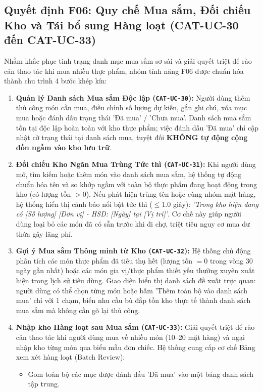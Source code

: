 \documentclass[10pt,a4paper]{article}
\begin{document}
\newpage
\subsection{Quyết định F06: Quy chế Mua sắm, Đối chiếu Kho và Tái bổ sung Hàng loạt (CAT-UC-30 đến CAT-UC-33)}
Nhằm khắc phục tình trạng danh mục mua sắm sơ sài và giải quyết triệt để rào cản thao tác khi mua nhiều thực phẩm, nhóm tính năng F06 được chuẩn hóa thành chu trình 4 bước khép kín:
\begin{enumerate}[itemsep=1pt]
    \item \textbf{Quản lý Danh sách Mua sắm Độc lập (\texttt{CAT-UC-30}):} Người dùng thêm thủ công món cần mua, điều chỉnh số lượng dự kiến, gắn ghi chú, xóa mục mua hoặc đánh dấu trạng thái 'Đã mua' / 'Chưa mua'. Danh sách mua sắm tồn tại độc lập hoàn toàn với kho thực phẩm; việc đánh dấu 'Đã mua' chỉ cập nhật cờ trạng thái tại danh sách mua, tuyệt đối \textbf{KHÔNG tự động cộng dồn ngầm vào kho lưu trữ}.
    \item \textbf{Đối chiếu Kho Ngăn Mua Trùng Tức thì (\texttt{CAT-UC-31}):} Khi người dùng mở, tìm kiếm hoặc thêm món vào danh sách mua sắm, hệ thống tự động chuẩn hóa tên và so khớp ngầm với toàn bộ thực phẩm đang hoạt động trong kho (có lượng tồn $>0$). Nếu phát hiện trùng tên hoặc cùng nhóm mặt hàng, hệ thống hiển thị cảnh báo nổi bật tức thì ($\le 1.0$ giây): \textit{'Trong kho hiện đang có [Số lượng] [Đơn vị] - HSD: [Ngày] tại [Vị trí]'}. Cơ chế này giúp người dùng loại bỏ các món đã có sẵn trước khi đi chợ, triệt tiêu nguy cơ mua dư thừa gây lãng phí.
    \item \textbf{Gợi ý Mua sắm Thông minh từ Kho (\texttt{CAT-UC-32}):} Hệ thống chủ động phân tích các món thực phẩm đã tiêu thụ hết (lượng tồn $=0$ trong vòng 30 ngày gần nhất) hoặc các món gia vị/thực phẩm thiết yếu thường xuyên xuất hiện trong lịch sử tiêu dùng. Giao diện hiển thị danh sách đề xuất trực quan: người dùng có thể chọn từng món hoặc bấm 'Thêm toàn bộ vào danh sách mua' chỉ với 1 chạm, biến nhu cầu bù đắp tồn kho thực tế thành danh sách mua sắm mà không cần gõ lại thủ công.
    \item \textbf{Nhập kho Hàng loạt sau Mua sắm (\texttt{CAT-UC-33}):} Giải quyết triệt để rào cản thao tác khi người dùng mua về nhiều món (10--20 mặt hàng) và ngại nhập kho từng món qua biểu mẫu đơn chiếc. Hệ thống cung cấp cơ chế Bảng xem xét hàng loạt (Batch Review):
    \begin{itemize}[itemsep=1pt]
        \item Gom toàn bộ các mục được đánh dấu 'Đã mua' vào một bảng danh sách tập trung.

\end{itemize}
\end{enumerate}
\end{document}
